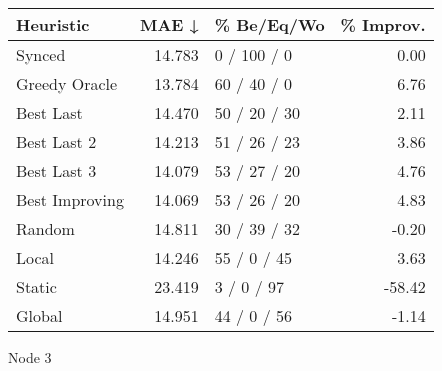 \begin{tabular}{lrlr}
\toprule
\textbf{Heuristic} & \textbf{MAE ↓} & \textbf{\% Be/Eq/Wo} & \textbf{\% Improv.} \\
\midrule
            Synced &         14.783 &          0 / 100 / 0 &                0.00 \\
     Greedy Oracle &         13.784 &          60 / 40 / 0 &                6.76 \\
         Best Last &         14.470 &         50 / 20 / 30 &                2.11 \\
       Best Last 2 &         14.213 &         51 / 26 / 23 &                3.86 \\
       Best Last 3 &         14.079 &         53 / 27 / 20 &                4.76 \\
    Best Improving &         14.069 &         53 / 26 / 20 &                4.83 \\
            Random &         14.811 &         30 / 39 / 32 &               -0.20 \\
             Local &         14.246 &          55 / 0 / 45 &                3.63 \\
            Static &         23.419 &           3 / 0 / 97 &              -58.42 \\
            Global &         14.951 &          44 / 0 / 56 &               -1.14 \\
\bottomrule
\end{tabular}
\caption{Node 3}
\label{tab:iid_lr05_le2_bs2_3}
